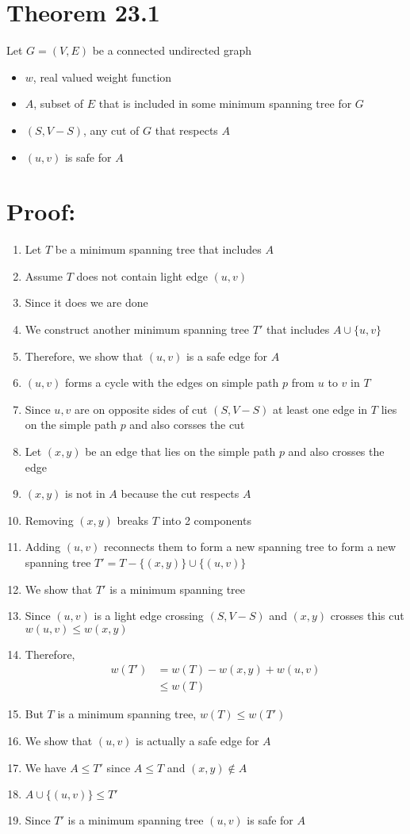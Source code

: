 \documentclass[a4paper, 10pt]{article}
\begin{document}
\section{Theorem 23.1}
Let $G = (V,E)$ be a connected undirected graph
\begin{itemize}
	\item $w$, real valued weight function
	\item $A$, subset of $E$ that is included in some minimum spanning tree for $G$
	\item $(S,V-S)$, any cut of $G$ that respects $A$
	\item $(u,v)$ is safe for $A$
\end{itemize}

\section{Proof:}
\begin{enumerate}
	\item Let $T$ be a minimum spanning tree that includes $A$ 
	\item Assume $T$ does not contain light edge $(u,v)$
	\item Since it does we are done
	\item We construct another minimum spanning tree $T'$ that includes 
		$A\cup \{u,v\}$
	\item Therefore, we show that $(u,v)$ is a safe edge for $A$
	\item $(u,v)$ forms a cycle with the edges on simple path $p$ from $u$ to
		$v$ in $T$
	\item Since $u,v$ are on opposite sides of cut $(S,V-S)$ at least one edge 
		in $T$ lies on the simple path $p$ and also corsses the cut
	\item Let $(x,y)$ be an edge that lies on the simple path $p$ and also 
		crosses the edge
	\item $(x,y)$ is not in $A$ because the cut respects $A$
	\item Removing $(x,y)$ breaks $T$ into 2 components
	\item Adding $(u,v)$ reconnects them to form a new spanning tree to form a new 
		spanning tree $T'=T-\{(x,y)\}\cup\{(u,v)\}$
	\item We show that $T'$ is a minimum spanning tree
	\item Since $(u,v)$ is a light edge crossing $(S,V-S)$ and $(x,y)$ crosses
		this cut $w(u,v)\leq w(x,y)$
	\item Therefore, \begin{align*} w(T')&=w(T)-w(x,y)+w(u,v) \\
		&\leq w(T)\end{align*}
	\item But $T$ is a minimum spanning tree, $w(T)\leq w(T')$
	\item We show that $(u,v)$ is actually a safe edge for $A$
	\item We have $A\leq T'$ since $A\leq T$ and $(x,y)\notin A$
	\item $A\cup\{(u,v)\}\leq T'$
	\item Since $T'$ is a minimum spanning tree $(u,v)$ is safe for $A$
\end{enumerate}
	
\end{document}
